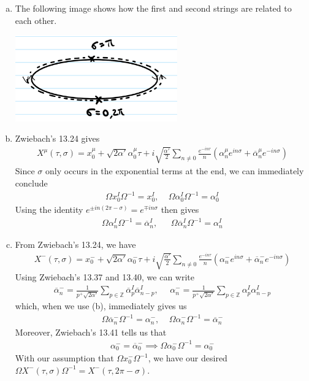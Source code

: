\documentclass[11pt]{article}
\begin{document}
\begin{enumerate} [(a)]
    \item The following image shows how the first and second strings are related to each other. 
    \begin{center}
        \includegraphics[width=7cm]{images/13_5a.png}
    \end{center}
    \item Zwiebach's 13.24 gives 
    \begin{align*}
        X^\mu(\tau, \sigma) = x^\mu_0 + \sqrt{2\alpha'} \alpha^\mu_0 \tau + i \sqrt{\frac{\alpha'}{2}} \sum_{n\neq 0} \frac{e^{-in\tau}}{n} (\alpha_n^\mu e^{in\sigma} + \overline{\alpha}_n^\mu e^{-in\sigma})
    \end{align*}
    Since $\sigma$ only occurs in the exponential terms at the end, we can immediately conclude 
    \begin{align*}
        \Omega x_0^I \Omega^{-1} = x_0^I, ~~~~~\Omega \alpha_0^I \Omega^{-1} = \alpha_0^I 
    \end{align*}
    Using the identity $e^{\pm in(2\pi - \sigma)} = e^{\mp in \sigma}$ then gives 
    \begin{align*}
        \Omega \alpha_n^I \Omega^{-1} = \overline{\alpha}_n^I, ~~~~~~~ \Omega \overline{\alpha}_n^I \Omega^{-1} = \alpha_n^I 
    \end{align*} 
    
    \item From Zwiebach's 13.24, we have 
    \begin{align*}
        X^-(\tau, \sigma) = x^-_0 + \sqrt{2\alpha'} \alpha^-_0 \tau + i \sqrt{\frac{\alpha'}{2}} \sum_{n\neq 0} \frac{e^{-in\tau}}{n} (\alpha_n^- e^{in\sigma} + \overline{\alpha}_n^- e^{-in\sigma})
    \end{align*}
    Using Zwiebach's 13.37 and 13.40, we can write 
    \begin{align*}
        \overline{\alpha}_n^- = \frac{1}{p^+ \sqrt{2\alpha'}} \sum_{p \in \mathbb{Z}} \overline{\alpha}_p^I \overline{\alpha}_{n-p}^I, ~~~~~~ \alpha_n^- = \frac{1}{p^+ \sqrt{2\alpha'}} \sum_{p \in\mathbb{Z}} \alpha_p^I \alpha_{n-p}^I 
    \end{align*}
    which, when we use (b), immediately gives us 
    \begin{align*}
        \Omega \overline{\alpha}_n^- \Omega^{-1} = \alpha_n^-, ~~~~~ \Omega \alpha_n^- \Omega^{-1} = \overline{\alpha}_n^- 
    \end{align*}
    Moreover, Zwiebach's 13.41 tells us that 
    \begin{align*}
        \alpha_0^- = \overline{\alpha}_0^- \implies \Omega \alpha_0^- \Omega^{-1} = \alpha_0^- 
    \end{align*}
    With our assumption that $\Omega x_0^- \Omega^{-1}$, we have our desired $\Omega X^-(\tau, \sigma) \Omega^{-1} = X^-(\tau, 2\pi - \sigma)$. 


\end{enumerate}
\end{document}
